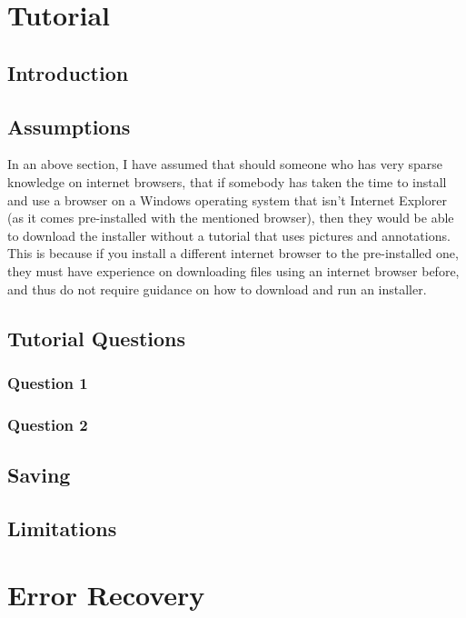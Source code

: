 \section{Tutorial}

\subsection{Introduction}

\subsection{Assumptions}
In an above section, I have assumed that should someone who has very sparse knowledge on internet browsers, that if somebody has taken the time to install and use a browser on a Windows operating system that isn't Internet Explorer (as it comes pre-installed with the mentioned browser), then they would be able to download the installer without a tutorial that uses pictures and annotations. This is because if you install a different internet browser to the pre-installed one, they must have experience on downloading files using an internet browser before, and thus do not require guidance on how to download and run an installer.

\subsection{Tutorial Questions}

\subsubsection{Question 1}

\subsubsection{Question 2}

\subsection{Saving}

\subsection{Limitations}

\section{Error Recovery}

